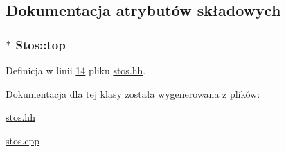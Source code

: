 \subsection{Dokumentacja atrybutów składowych}
\hypertarget{class_stos_adcfbb6ee470a16fa67eddb412dc556a0}{
\subsubsection[{top}]{$\ast$ Stos\-::top\hspace{0.3cm}{\ttfamily [private]}}}\label{class_stos_adcfbb6ee470a16fa67eddb412dc556a0}


Definicja w linii \hyperlink{stos_8hh_source_l00014}{14} pliku \hyperlink{stos_8hh_source}{stos.\-hh}.



Dokumentacja dla tej klasy została wygenerowana z plików\-:\begin{DoxyCompactItemize}
\item 
\hyperlink{stos_8hh}{stos.\-hh}\item 
\hyperlink{stos_8cpp}{stos.\-cpp}\end{DoxyCompactItemize}
